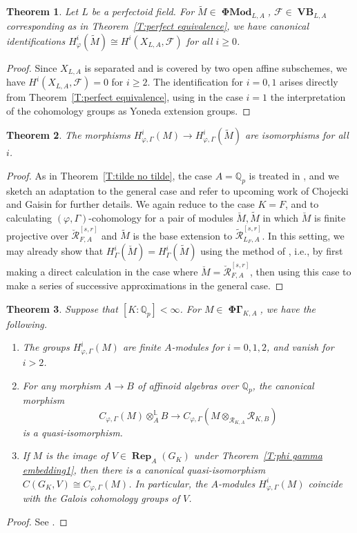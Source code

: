 \documentclass[12pt]{amsart}
\newtheorem{theorem}{Theorem}[section]
\theoremstyle{definition}
\numberwithin{equation}{theorem}
\newcommand{\QQ}{\mathbb{Q}}
\newcommand{\calF}{\mathcal{F}}
\newcommand{\calR}{\mathcal{R}}
\DeclareMathOperator{\PhiGamma}{\mathbf{\Phi \Gamma}}
\DeclareMathOperator{\PhiMod}{\mathbf{\Phi Mod}}
\DeclareMathOperator{\Rep}{\mathbf{Rep}}
\DeclareMathOperator{\VB}{\mathbf{VB}}
\begin{document}
\begin{theorem}
Let $L$ be a perfectoid field.
For $\tilde{M} \in \PhiMod_{L,A}$, $\calF \in \VB_{L,A}$ corresponding as in
Theorem~\ref{T:perfect equivalence}, we have canonical identifications
$H^i_{\varphi}(\tilde{M}) \cong H^i(X_{L,A}, \calF)$ for all $i \geq 0$.
\end{theorem}
\begin{proof}
Since $X_{L,A}$ is separated and is covered by two open affine subschemes, we have 
$H^i(X_{L,A}, \calF) = 0$ for $i \geq 2$. The identification for $i=0,1$ arises directly
from Theorem~\ref{T:perfect equivalence}, using in the case $i=1$ the interpretation of the cohomology groups as Yoneda extension groups.
\end{proof}


\begin{theorem} \label{T:compare phi Gamma cohomology}
The morphisms $H^i_{\varphi, \Gamma}(M) \to H^i_{\varphi, \Gamma}(\tilde{M})$ are isomorphisms for all $i$.
\end{theorem}
\begin{proof}
As in Theorem~\ref{T:tilde no tilde},
the case $A = \QQ_p$ is treated in \cite[Theorem~6.1.7]{kedlaya-liu2}, and we sketch
an adaptation to the general case and refer to upcoming work of Chojecki and Gaisin for further details. We again reduce to the case $K = F$, and to calculating $(\varphi, \Gamma)$-cohomology for a pair of modules $\breve{M}, \tilde{M}$ in which 
$\breve{M}$ is finite projective over $\breve{\calR}^{[s,r]}_{F,A}$
and $\tilde{M}$ is the base extension to $\tilde{\calR}^{[s,r]}_{L_F,A}$.
In this setting, we may already show that $H^i_{\Gamma}(\breve{M}) = H^i_{\Gamma}(\tilde{M})$ using the method of \cite[Lemma 5.6.6]{kedlaya-liu2}, i.e., by first making a direct calculation in the case where $\breve{M} = \breve{\calR}^{[s,r]}_{F,A}$,
then using this case to make a series of successive approximations in the general case.
\end{proof}

\begin{theorem} \label{T:coherence cohomology}
Suppose that $[K:\QQ_p] < \infty$.
For $M \in \PhiGamma_{K,A}$, we have the following.
\begin{enumerate}
\item[(a)] The groups $H^i_{\varphi, \Gamma}(M)$ are finite $A$-modules for $i=0,1,2$, and vanish for $i>2$.
\item[(b)] For any morphism $A \to B$ of affinoid algebras over $\QQ_p$, the canonical morphism
\[
C_{\varphi, \Gamma}(M) \otimes^{\mathbb{L}}_A B
\to C_{\varphi, \Gamma}(M \otimes_{\calR_{K,A}} \calR_{K,B})
\]
is a quasi-isomorphism.
\item[(c)]
If $M$ is the image of $V \in \Rep_A(G_K)$ under Theorem~\ref{T:phi gamma embedding1},
then there is a canonical quasi-isomorphism $C(G_K, V) \cong C_{\varphi, \Gamma}(M)$.
In particular, the $A$-modules $H^i_{\varphi, \Gamma}(M)$ coincide with the Galois cohomology groups of $V$.
\end{enumerate}
\end{theorem}
\begin{proof}
See \cite[Proposition~2.3.7, Theorem~4.4.2, Theorem~4.4.3]{kpx}.
\end{proof}
\end{document}
